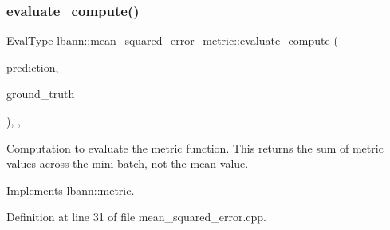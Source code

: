 \subsubsection{\texorpdfstring{evaluate\+\_\+compute()}{evaluate\_compute()}}
{\footnotesize\ttfamily \hyperlink{base_8hpp_a3266f5ac18504bbadea983c109566867}{Eval\+Type} lbann\+::mean\+\_\+squared\+\_\+error\+\_\+metric\+::evaluate\+\_\+compute (\begin{DoxyParamCaption}\item[{const \hyperlink{base_8hpp_a9a697a504ae84010e7439ffec862b470}{Abs\+Dist\+Mat} \&}]{prediction,  }\item[{const \hyperlink{base_8hpp_a9a697a504ae84010e7439ffec862b470}{Abs\+Dist\+Mat} \&}]{ground\+\_\+truth }\end{DoxyParamCaption})\hspace{0.3cm}{\ttfamily [override]}, {\ttfamily [protected]}, {\ttfamily [virtual]}}

Computation to evaluate the metric function. This returns the sum of metric values across the mini-\/batch, not the mean value. 

Implements \hyperlink{classlbann_1_1metric_aab79147ff480675db2e01d7a889a4296}{lbann\+::metric}.



Definition at line 31 of file mean\+\_\+squared\+\_\+error.\+cpp.


